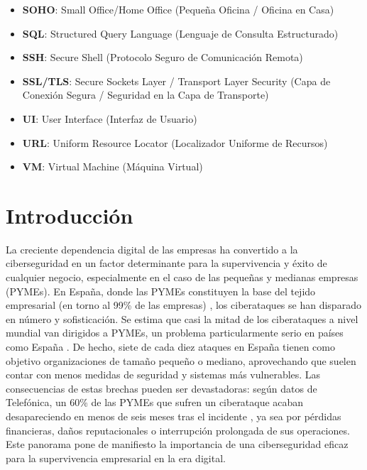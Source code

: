 \documentclass[11pt,a4paper,twoside]{report}
\begin{document}
\begin{itemize}
	\item \textbf{SOHO}: Small Office/Home Office (Pequeña Oficina / Oficina en Casa)
	\item \textbf{SQL}: Structured Query Language (Lenguaje de Consulta Estructurado)
	\item \textbf{SSH}: Secure Shell (Protocolo Seguro de Comunicación Remota)
	\item \textbf{SSL/TLS}: Secure Sockets Layer / Transport Layer Security (Capa de Conexión Segura / Seguridad en la Capa de Transporte)
	\item \textbf{UI}: User Interface (Interfaz de Usuario)
	\item \textbf{URL}: Uniform Resource Locator (Localizador Uniforme de Recursos)
	\item \textbf{VM}: Virtual Machine (Máquina Virtual)
\end{itemize}

\clearpage
\null
\thispagestyle{empty}
\newpage
\chapter{Introducción}

La creciente dependencia digital de las empresas ha convertido a la ciberseguridad en un factor determinante para la supervivencia y éxito de cualquier negocio, especialmente en el caso de las pequeñas y medianas empresas (PYMEs). En España, donde las PYMEs constituyen la base del tejido empresarial (en torno al 99\% de las empresas) \cite{enisa2023}
, los ciberataques se han disparado en número y sofisticación. Se estima que casi la mitad de los ciberataques a nivel mundial van dirigidos a PYMEs, un problema particularmente serio en países como España \cite{google2024}. De hecho, siete de cada diez ataques en España tienen como objetivo organizaciones de tamaño pequeño o mediano, aprovechando que suelen contar con menos medidas de seguridad y sistemas más vulnerables. Las consecuencias de estas brechas pueden ser devastadoras: según datos de Telefónica, un 60\% de las PYMEs que sufren un ciberataque acaban desapareciendo en menos de seis meses tras el incidente \cite{telefonica2023}, ya sea por pérdidas financieras, daños reputacionales o interrupción prolongada de sus operaciones. Este panorama pone de manifiesto la importancia de una ciberseguridad eficaz para la supervivencia empresarial en la era digital.\newline
\end{document}
